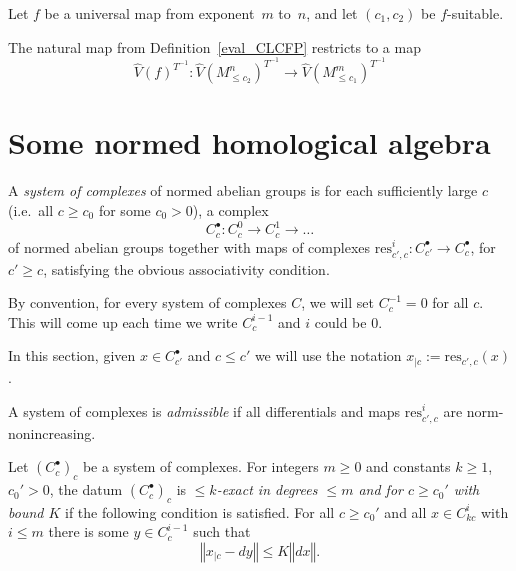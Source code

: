 \begin{definition}
  \label{eval_CLCFPTinv}
  \leanok
  Let $f$ be a universal map from exponent~$m$ to~$n$,
  and let $(c_1, c_2)$ be $f$-suitable.

  The natural map from Definition~\ref{eval_CLCFP}
  restricts to a map
  \[
    \hat V(f)^{T^{-1}} \colon \hat V(M_{\le c_2}^n)^{T^{-1}} \to \hat V(M_{\le c_1}^m)^{T^{-1}}
  \]
\end{definition}

\section{Some normed homological algebra}%
\label{sec:some_normed_homological_algebra}

\begin{definition}
  \label{system_of_complexes}
  \leanok
  A \emph{system of complexes} of normed abelian groups
  is for each sufficiently large $c$ (i.e.~all $c\geq c_0$ for some $c_0>0$),
  a complex
  \[
  C_c^\bullet: C_c^0\to C_c^1\to\ldots
  \]
  of normed abelian groups together with maps of complexes
  $\mathrm{res}_{c',c}^i: C_{c'}^\bullet\to C_c^\bullet$,
  for $c' ≥ c$,
  satisfying the obvious associativity condition.
\end{definition}

By convention, for every system of complexes $C$, we will set $C^{-1}_c = 0$ for all $c$.
This will come up each time we write $C^{i-1}_c$ and $i$ could be $0$.

In this section, given $x ∈ C^•_{c'}$ and $c ≤ c'$ we will use the notation
$x_{|c} := \mathrm{res}_{c', c}(x)$.

\begin{definition}
  \label{admissible}
  \leanok
  A system of complexes is \emph{admissible}
  if all differentials and maps $\mathrm{res}_{c',c}^i$ are norm-nonincreasing.
\end{definition}

\begin{definition}
  \label{is_bounded_exact}
  \leanok
  Let $(C_c^\bullet)_c$ be a system of complexes.
  For integers $m\geq 0$ and constants $k \ge 1$, $c_0'>0$,
  the datum $(C_c^\bullet)_c$ is
  \emph{$\leq k$-exact in degrees $\leq m$ and for $c\geq c_0'$ with bound $K$} if the following condition is satisfied.
  For all $c\geq c_0'$ and all $x\in C_{kc}^i$ with $i\leq m$
  there is some $y\in C_c^{i-1}$ such that
  \[
    ‖x_{|c} - dy‖ ≤ K ‖dx‖.
  \]
\end{definition}

